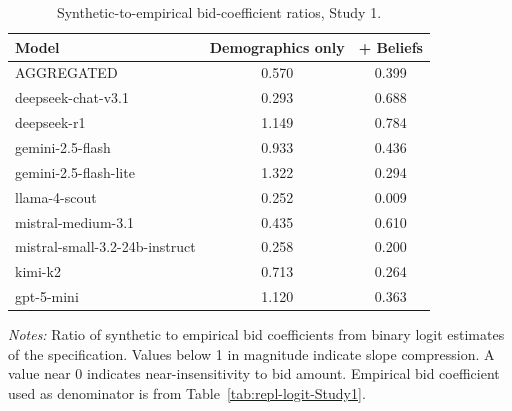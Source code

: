 \begin{table}[h]
\centering
\caption{Synthetic-to-empirical bid-coefficient ratios, Study 1.}
\label{tab:slope-ratios-Study1}
\begin{threeparttable}
\footnotesize
\begin{tabular}{lcc}
\toprule
Model & Demographics only & + Beliefs \\
\midrule
AGGREGATED &   0.570 &   0.399 \\
\midrule
deepseek-chat-v3.1 &   0.293 &   0.688 \\
deepseek-r1 &   1.149 &   0.784 \\
gemini-2.5-flash &   0.933 &   0.436 \\
gemini-2.5-flash-lite &   1.322 &   0.294 \\
llama-4-scout &   0.252 &   0.009 \\
mistral-medium-3.1 &   0.435 &   0.610 \\
mistral-small-3.2-24b-instruct &   0.258 &   0.200 \\
kimi-k2 &   0.713 &   0.264 \\
gpt-5-mini &   1.120 &   0.363 \\
\bottomrule
\end{tabular}
\begin{tablenotes}\footnotesize
\item \textit{Notes:} Ratio of synthetic to empirical bid coefficients from binary logit estimates of the \textcite{Aldy2012} specification. 
Values below 1 in magnitude indicate slope compression. 
A value near 0 indicates near-insensitivity to bid amount. 
Empirical bid coefficient used as denominator is from Table~\ref{tab:repl-logit-Study1}.
\end{tablenotes}
\end{threeparttable}
\end{table}
